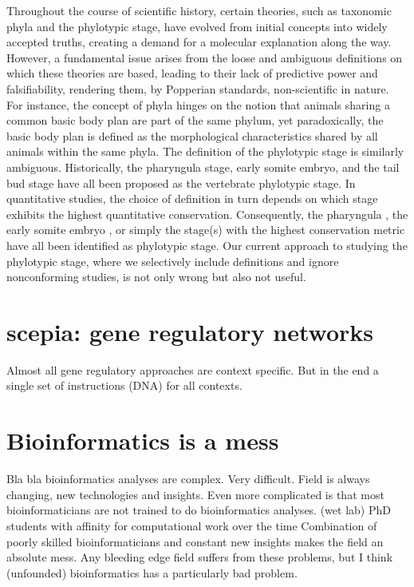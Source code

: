 Throughout the course of scientific history, certain theories, such as taxonomic phyla and the phylotypic stage, have evolved from initial concepts into widely accepted truths, creating a demand for a molecular explanation along the way. However, a fundamental issue arises from the loose and ambiguous definitions on which these theories are based, leading to their lack of predictive power and falsifiability, rendering them, by Popperian standards, non-scientific in nature. For instance, the concept of phyla hinges on the notion that animals sharing a common basic body plan are part of the same phylum, yet paradoxically, the basic body plan is defined as the morphological characteristics shared by all animals within the same phyla\cite{BUDD2000}. The definition of the phylotypic stage is similarly ambiguous. Historically, the pharyngula stage\cite{https://doi.org/10.1093/icb/21.2.391}, early somite embryo\cite{ https://doi.org/10.1046/j.1420-9101.1993.6030457.x}, and the tail bud stage \cite{Slack1993} have all been proposed as the vertebrate phylotypic stage. In quantitative studies, the choice of definition in turn depends on which stage exhibits the highest quantitative conservation. Consequently, the pharyngula \cite{Irie2011,marletaz2018}, the early somite embryo \cite{DomazetLoso2010}, or simply the stage(s) with the highest conservation metric\cite{Kalinka2010,Cordero2020} have all been identified as phylotypic stage. Our current approach to studying the phylotypic stage, where we selectively include definitions and ignore nonconforming studies, is not only wrong but also not useful.

\section{scepia: gene regulatory networks}

Almost all gene regulatory approaches are context specific. But in the end a single set of instructions (DNA) for all contexts.


\section{Bioinformatics is a mess}

Bla bla bioinformatics analyses are complex. Very difficult. 
Field is always changing, new technologies and insights.
Even more complicated is that most bioinformaticians are not trained to do bioinformatics analyses.
(wet lab) PhD students with affinity for computational work over the time 
Combination of poorly skilled bioinformaticians and constant new insights makes the field an absolute mess.
Any bleeding edge field suffers from these problems, but I think (unfounded) bioinformatics has a particularly bad problem.

